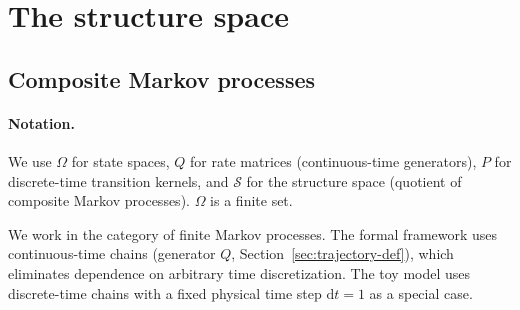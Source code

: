 \documentclass[12pt]{article}
\theoremstyle{remark}
\begin{document}

\section{The structure space}

\subsection{Composite Markov processes}\label{sec:composite}

\paragraph{Notation.} We use $\Omega$ for state spaces, $Q$ for rate matrices (continuous-time generators), $P$ for discrete-time transition kernels, and $\mathcal{S}$ for the structure space (quotient of composite Markov processes). $\Omega$ is a finite set.

We work in the category of finite Markov processes. The formal framework uses continuous-time chains (generator $Q$, Section~\ref{sec:trajectory-def}), which eliminates dependence on arbitrary time discretization. The toy model uses discrete-time chains with a fixed physical time step $\mathrm{d}t = 1$ as a special case.
\end{document}
